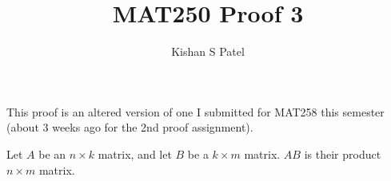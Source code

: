 \documentclass{exam}
\theoremstyle{plain}
\theoremstyle{definition}
\begin{document}
\title{MAT250 Proof 3}
\author{Kishan S Patel}
\maketitle

\renewcommand{\qedsymbol}{QED}

This proof is an altered version of one I submitted for MAT258 this semester (about 3 weeks ago for the 2nd proof assignment).


Let $A$ be an $n\times k$ matrix, and let $B$ be a $k\times m$ matrix. $AB$ is their product $n\times m$ matrix.

\begin{questions}
	
	
\end{questions}
\end{document}
